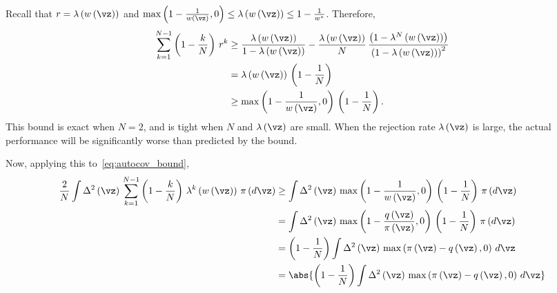 \begin{proofEnd}
Recall that \(r = \lambda\left(w\left(\vz\right)\right)\) and \(\max\left(1 - \frac{1}{w\left(\vz\right)}, 0\right) \leq \lambda\left(w\left(\vz\right)\right) \leq 1 - \frac{1}{w^*}\).
Therefore,
\begin{align}
 \sum_{k=1}^{N-1} \left(1 - \frac{k}{N}\right) \, r^k
 &\geq 
 \frac{\lambda\left(w\left(\vz\right)\right)}{1-\lambda\left(w\left(\vz\right)\right)} -
 \frac{\lambda\left(w\left(\vz\right)\right)}{N}\,\frac{\left(1-\lambda^N\left(w\left(\vz\right)\right)\right)}{{\left(1-\lambda\left(w\left(\vz\right)\right)\right)}^2} \label{eq:tight_cov_bound}
 \\
 &=
 \lambda\left(w\left(\vz\right)\right)\,\left(1 - \frac{1}{N}\right)
 \\
 &\geq
 \max\left(1 - \frac{1}{w\left(\vz\right)}, 0\right)\,\left(1 - \frac{1}{N}\right).
\end{align}
This bound is exact when \(N=2\), and is tight when \(N\) and \(\lambda\left(\vz\right)\) are small.
When the rejection rate \(\lambda\left(\vz\right)\) is large, the actual performance will be significantly worse than predicted by the bound.

Now, applying this to~\cref{eq:autocov_bound},
\begin{align}
\frac{2}{N}
  \int
  \Delta^2\left(\vz\right) \,
   \sum_{k=1}^{N-1} 
  \left(1 - \frac{k}{N}\right) \, \lambda^k\left(w\left(\vz\right)\right)
  \, \pi\left(d\vz\right)
  &\geq
  \int
  \Delta^2\left(\vz\right)
  \,
  \max\left(1 - \frac{1}{w\left(\vz\right)}, 0\right)\,\left(1 - \frac{1}{N}\right)
  \,
  \pi\left(d\vz\right)
  \\
  &=
  \int
  \Delta^2\left(\vz\right)
  \,
  \max\left(1 - \frac{q\left(\vz\right)}{\pi\left(\vz\right)}, 0\right)\,\left(1 - \frac{1}{N}\right)
  \,
  \pi\left(d\vz\right)
  \\
  &=
  \left(1 - \frac{1}{N}\right)
  \int
  \Delta^2\left(\vz\right)
  \,
  \max\left(\pi\left(\vz\right) - q\left(\vz\right), 0\right)\,
  d\vz
  \\
  &=
  \abs{
    \left(1 - \frac{1}{N}\right)
    \int
    \Delta^2\left(\vz\right)
    \,
    \max\left(\pi\left(\vz\right) - q\left(\vz\right), 0\right)\,
    d\vz
  }
\end{align}


\end{proofEnd}
